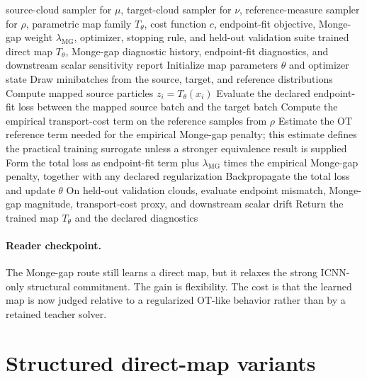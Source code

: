 \begin{algorithm}[ht]
\caption{\texttt{train\_monge\_gap\_regularized\_direct\_map}}
\begin{algorithmic}[1]
\Require source-cloud sampler for \(\mu\), target-cloud sampler for \(\nu\), reference-measure sampler for \(\rho\), parametric map family \(T_\theta\), cost function \(c\), endpoint-fit objective, Monge-gap weight \(\lambda_{\mathrm{MG}}\), optimizer, stopping rule, and held-out validation suite
\Ensure trained direct map \(T_\theta\), Monge-gap diagnostic history, endpoint-fit diagnostics, and downstream scalar sensitivity report
\State Initialize map parameters \(\theta\) and optimizer state
  \State Draw minibatches from the source, target, and reference distributions
  \State Compute mapped source particles \(z_i=T_\theta(x_i)\)
  \State Evaluate the declared endpoint-fit loss between the mapped source batch and the target batch
  \State Compute the empirical transport-cost term on the reference samples from \(\rho\)
  \State Estimate the OT reference term needed for the empirical Monge-gap penalty; this estimate defines the practical training surrogate unless a stronger equivalence result is supplied
  \State Form the total loss as endpoint-fit term plus \(\lambda_{\mathrm{MG}}\) times the empirical Monge-gap penalty, together with any declared regularization
  \State Backpropagate the total loss and update \(\theta\)
\EndWhile
\State On held-out validation clouds, evaluate endpoint mismatch, Monge-gap magnitude, transport-cost proxy, and downstream scalar drift
\State Return the trained map \(T_\theta\) and the declared diagnostics
\end{algorithmic}
\end{algorithm}

\paragraph{Reader checkpoint.}
The Monge-gap route still learns a direct map, but it relaxes the strong ICNN-only
structural commitment.  The gain is flexibility.  The cost is that the learned map
is now judged relative to a regularized OT-like behavior rather than by a retained
teacher solver.

\section{Structured direct-map variants}
\label{sec:bf-neural-ot-direct-structured}

